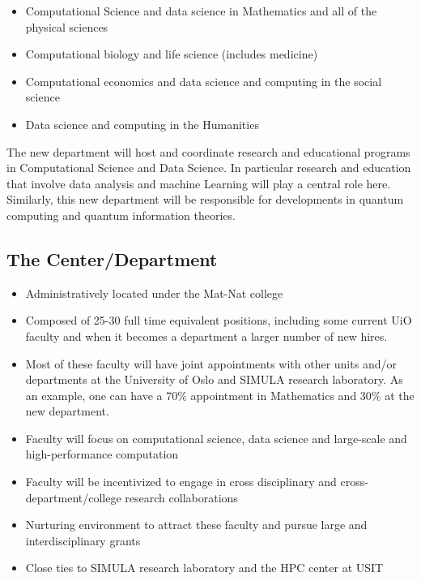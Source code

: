 \documentclass[%
oneside,                 %
final,                   %
10pt]{article}
\begin{document}
\begin{itemize}
\item Computational Science and data science in Mathematics and all of the physical sciences

\item Computational biology and life science (includes medicine)

\item Computational economics and data science and computing in the social science

\item Data science and computing in the Humanities
\end{itemize}

\noindent
The new department will host and coordinate research and educational programs in Computational Science and Data Science. In particular research and education that involve  data analysis and machine Learning will play a central role here. Similarly, this new department will be responsible for developments in quantum computing and quantum information theories. 

\subsection{The Center/Department}
\begin{itemize}
\item Administratively located under the Mat-Nat college

\item Composed of 25-30 full time equivalent positions, including some current UiO faculty and when it becomes a department a larger number of new hires.

\item Most of these faculty will have joint appointments with other units and/or departments at the University of Oslo and SIMULA research laboratory. As an example, one can have a 70\% appointment in Mathematics and 30\% at the new department. 

\item Faculty will focus on computational science, data science and large-scale and high-performance computation	

\item Faculty will be incentivized to engage in cross disciplinary and cross-department/college research collaborations	

\item Nurturing environment to attract these faculty and pursue large and interdisciplinary grants	

\item Close ties to SIMULA research laboratory and the HPC center at USIT
\end{itemize}
\end{document}
